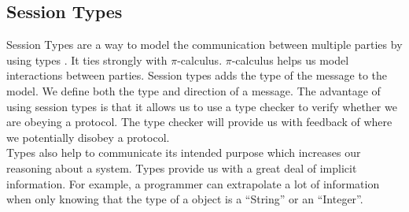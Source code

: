 \subsection{Session Types}
Session Types are a way to model the communication between multiple parties by using types \cite{dardha2012session}. It ties strongly with $\pi$-calculus. $\pi$-calculus helps us model interactions between parties. Session types adds the type of the message to the model. We define both the type and direction of a message. The advantage of using session types is that it allows us to use a type checker to verify whether we are obeying a protocol. The type checker will provide us with feedback of where we potentially disobey a protocol.
\\
Types also help to communicate its intended purpose which increases our reasoning about a system. Types provide us with a great deal of implicit information. For example, a programmer can extrapolate a lot of information when only knowing that the type of a object is a ``String'' or an ``Integer''.



\iffalse
They model a protocol - ideal implementation. Perfect model - Erroneous implementation
from paper to code hope they match up. 

Minimize the leap from  human work, make machine checkable. 

Talk about session types.


[1] Mark B. Abbott and Larry L. Peterson. A language-based approach
to protocol implementation. IEEE/ACM Transactions
on Networking, 1(1):4–19, February 1993

7 Claude Castelluccia, Walid Dabbous, and Sean O’Malley.
Generating efficient protocol code from an abstract specification.
In Proceedings of the ACM SIGCOMM 1996 Conference,
pages 60–71, August 1996.

10 P. Dembinski and S. Budkowski. Specification language Estelle.
In Michel Diaz, Jean-Pierre Ansart, Jean-Pierre Courtiat,
Pierre Azema, and Vijaya Chari, editors, The formal description
technique Estelle, pages 35–75. North-Holland, 1989.

11 Diane Hernek and David P. Anderson. Efficient automated protocol
implementation using RTAG. Report UCB/CSD 89/526,
University of California at Berkeley, August 1989.

17 Linda Ness. L.0: a parallel executable temporal logic language.
In Mark Moriconi, editor, Proceedings of the ACM SIGSOFT
International Workshop on Formal Methods in Software Development,
pages 80–89, September 1990.
\fi

